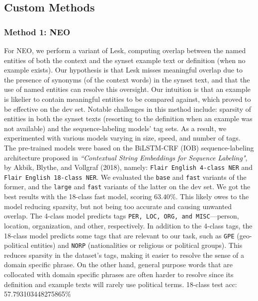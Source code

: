 \documentclass[11pt]{article}
\begin{document}
\subsection{Custom Methods}
\subsubsection{Method 1: NEO}
For NEO, we perform a variant of Lesk, computing overlap between the named entities of 
both the context and the synset example text or definition (when no example exists). 
Our hypothesis is that Lesk misses meaningful overlap due to the presence of 
synonyms (of the context words) in the synset text, and that the use of named entities can resolve this oversight.
Our intuition is that an example is likelier to contain meaningful entities to be compared against,
which proved to be effective on the dev set. Notable challenges in 
this method include: sparsity of entities in both the synset texts 
(resorting to the definition when an example was not available) and the sequence-labeling models' tag sets. 
As a result, we experimented with various models varying in size, speed, and number of tags. 
The pre-trained models were based on the BiLSTM-CRF (IOB) sequence-labeling architecture proposed in 
\textit{``Contextual String Embeddings for Sequence Labeling"}, 
by Akbik, Blythe, and Vollgraf (2018), namely: \texttt{Flair English 4-class NER} and \texttt{Flair English 18-class NER}.
We evaluated the \texttt{base} and \texttt{fast} variants of the former, and the \texttt{large} 
and \texttt{fast} variants of the latter on the dev set. We got the  
best results with the 18-class fast model, scoring $63.40\%$. This likely owes to the model
reducing sparsity, but not being too accurate and causing unwanted overlap. The 4-class model predicts tags \texttt{PER, LOC, ORG, and MISC}---person, location, organization, and other, respectively. 
In addition to the 4-class tags, the 18-class model predicts some tags that are relevant to our task, such as \texttt{GPE} (geo-political entities) and \texttt{NORP} (nationalities or 
religious or political groups). This reduces sparsity in the dataset's tags, making it easier to resolve the sense of a domain specific phrase. On the other hand,
general purpose words that are collocated with domain specific phrases are often harder to resolve since
its definition and example texts will rarely use political terms.
18-class test acc: 57.793103448275865\%
\end{document}
